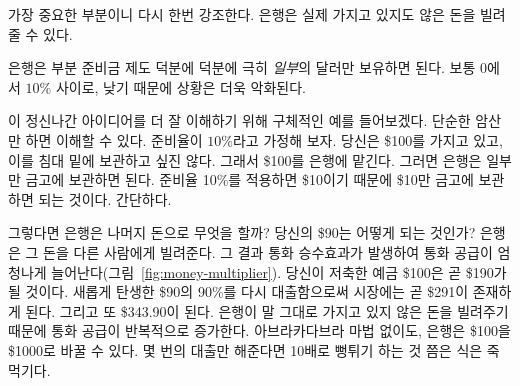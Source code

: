 \begin{comment}
	Let me repeat the most important part: banks can lend money that they
	don't actually have.
\end{comment}
가장 중요한 부분이니 다시 한번 강조한다.
은행은 실제 가지고 있지도 않은 돈을 빌려줄 수 있다.

\begin{comment}
	Thanks to fractional reserve banking, a bank only has to keep a small
	\textit{fraction} of every dollar it gets. It's somewhere between $0$ and $10\%$,
	usually at the lower end, which makes things even worse.
\end{comment}
은행은 부분 준비금 제도 덕분에 덕분에 극히 \textit{일부}의 달러만 보유하면 된다. 
보통 $0$에서 $10\%$ 사이로, 낮기 때문에 상황은 더욱 악화된다.

\begin{comment}
	Let's use a concrete example to better understand this crazy idea: A
	fraction of $10\%$ will do the trick and we should be able to do all the
	calculations in our head. Win-win. So, if you take \$100 to a
	bank --- because you don't want to store it under your mattress --- they
	only have to keep the agreed upon \textit{fraction} of it. In our example that
	would be \$10, because 10\% of \$100 is \$10. Easy, right?
\end{comment}
이 정신나간 아이디어를 더 잘 이해하기 위해 구체적인 예를 들어보겠다. 
단순한 암산만 하면 이해할 수 있다. 준비율이 $10\%$라고 가정해 보자.
당신은 \$100를 가지고 있고, 이를 침대 밑에 보관하고 싶진 않다.
그래서 \$100를 은행에 맡긴다. 그러면 은행은 일부만 금고에 보관하면 된다.
준비율 10\%를 적용하면 \$10이기 때문에 \$10만 금고에 보관하면 되는 것이다.  
간단하다.

\begin{comment}
	So what do banks do with the rest of the money? What happens to your \$90? They
	do what banks do, they lend it to other people. The result is a money multiplier
	effect, which increases the money supply in the economy enormously
	(Figure~\ref{fig:money-multiplier}). Your initial deposit of \$100 will soon
	turn into \$190. By lending a 90\% fraction of the newly created \$90, there
	will soon be \$271 in the economy. And \$343.90 after that. The money supply is
	recursively increasing, since banks are literally lending money they don't
	have~\cite{wiki:money-multiplier}. Without a single Abracadabra, banks magically
	transform \$100 into one thousand dollars or more. Turns out 10x is easy. It
	only takes a couple of lending rounds.
\end{comment}
그렇다면 은행은 나머지 돈으로 무엇을 할까? 
당신의 \$90는 어떻게 되는 것인가? 
은행은 그 돈을 다른 사람에게 빌려준다. 
그 결과 통화 승수효과가 발생하여 통화 공급이 엄청나게 늘어난다(그림~\ref{fig:money-multiplier}). 
당신이 저축한 예금 \$100은 곧 \$190가 될 것이다. 
새롭게 탄생한 \$90의 90\%를 다시 대출함으로써 시장에는 곧 \$291이 존재하게 된다. 
그리고 또 \$343.90이 된다. 
은행이 말 그대로 가지고 있지 않은 돈을 빌려주기 때문에 통화 공급이 반복적으로 증가한다\cite{wiki:money-multiplier}. 
아브라카다브라 마법 없이도, 은행은 \$100을 \$1000로 바꿀 수 있다. 
몇 번의 대출만 해준다면 10배로 뻥튀기 하는 것 쯤은 식은 죽 먹기다.

